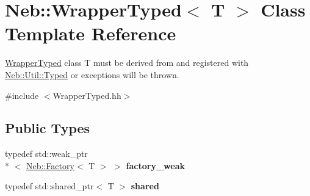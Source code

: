 \hypertarget{classNeb_1_1WrapperTyped}{\section{Neb\-:\-:Wrapper\-Typed$<$ T $>$ Class Template Reference}
\label{classNeb_1_1WrapperTyped}
}


\hyperlink{classNeb_1_1WrapperTyped}{Wrapper\-Typed} class T must be derived from and registered with \hyperlink{classNeb_1_1Util_1_1Typed}{Neb\-::\-Util\-::\-Typed} or exceptions will be thrown.  




{\ttfamily \#include $<$Wrapper\-Typed.\-hh$>$}

\subsection*{Public Types}
\begin{DoxyCompactItemize}
\item 
\hypertarget{classNeb_1_1WrapperTyped_a5aa27220e225486790dc20ba7ec748fb}{typedef std\-::weak\-\_\-ptr\\*
$<$ \hyperlink{classNeb_1_1Factory}{Neb\-::\-Factory}$<$ T $>$ $>$ {\bfseries factory\-\_\-weak}}\label{classNeb_1_1WrapperTyped_a5aa27220e225486790dc20ba7ec748fb}

\item 
\hypertarget{classNeb_1_1WrapperTyped_a3467a3d9954e2176508f0913fb28bc43}{typedef std\-::shared\-\_\-ptr$<$ T $>$ {\bfseries shared}}\label{classNeb_1_1WrapperTyped_a3467a3d9954e2176508f0913fb28bc43}

\end{DoxyCompactItemize}
